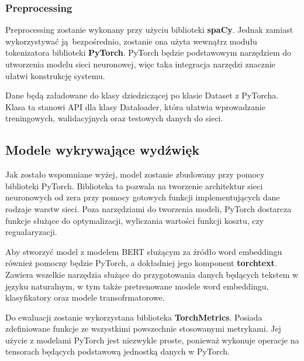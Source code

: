 \subsubsection{Preprocessing}
Preprocessing zostanie wykonany przy użyciu biblioteki \textbf{spaCy}\cite{spacy2}. Jednak zamiast 
wykorzystywać ją bezpośrednio, zostanie ona użyta wewnątrz modułu tokenizatora biblioteki
\textbf{PyTorch}\cite{pytorch}. PyTorch będzie podstawowym narzędziem do utworzenia modelu sieci
neuronowej, więc taka integracja narzędzi znacznie ułatwi konstrukcję systemu.

Dane będą załadowane do klasy dziedziczącej po klasie Dataset z PyTorcha. Klasa ta stanowi
API dla klasy Dataloader, która ułatwia wprowadzanie treningowych, walidacyjnych oraz testowych
danych do sieci.

\subsection{Modele wykrywające wydźwięk}
Jak zostało wspomniane wyżej, model zostanie zbudowany przy pomocy biblioteki PyTorch\cite{pytorch}.
Biblioteka ta pozwala na tworzenie architektur sieci neuronowych od zera przy pomocy
gotowych funkcji implementujących dane rodzaje warstw sieci. Poza narzędziami do tworzenia
modeli, PyTorch dostarcza funkcje służące do optymalizacji, wyliczania wartości funkcji
kosztu, czy regualaryzacji.

Aby stworzyć model z modelem BERT służącym za źródło word embeddingu również pomocny będzie 
PyTorch, a dokładniej jego komponent \textbf{torchtext}. Zawiera wszelkie narzędzia służące
do przygotowania danych będących tekstem w języku naturalnym, w tym także pretrenowane modele
word embeddingu, klasyfikatory oraz modele transofrmatorowe.

Do ewaluacji zostanie wykorzystana biblioteka \textbf{TorchMetrics}\cite{torchmetrics}. Posiada zdefiniowane
funkcje ze wszystkimi powszechnie stosowanymi metrykami. Jej użycie z modelami PyTorch jest
niezwykle proste, ponieważ wykonuje operacje na tensorach będących podstawową jednostką
danych w PyTorch.
